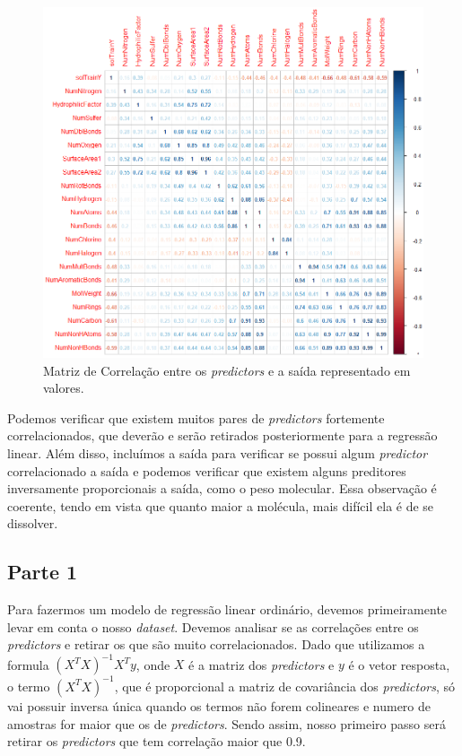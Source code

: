 \documentclass[a4paper,11pt]{article}
\begin{document}
	\begin{figure}[!h]
		\includegraphics[scale=0.7]{fig/corrplotNumber}
		\caption{Matriz de Correlação entre os \textit{predictors} e a saída representado em valores.}
		\label{fig:Figura 2}
	\end{figure}
	Podemos verificar que existem muitos pares de \textit{predictors} fortemente correlacionados, que deverão e serão retirados posteriormente para a regressão linear. Além disso, incluímos a saída para verificar se possui algum \textit{predictor} correlacionado a saída e podemos verificar que existem alguns preditores inversamente proporcionais a saída, como o peso molecular. Essa observação é coerente, tendo em vista que quanto maior a molécula, mais difícil ela é de se dissolver.
	\newpage
	\begin{center}
		\section*{Parte 1}
	\end{center}
	Para fazermos um modelo de regressão linear ordinário, devemos primeiramente levar em conta o nosso \textit{dataset}. Devemos analisar se as correlações entre os \textit{predictors} e retirar os que são muito correlacionados. Dado que utilizamos a formula $(X^{T} X)^{-1}X^{T}y$, onde $X$ é a matriz dos \textit{predictors} e $y$ é o vetor resposta, o termo $(X^{T} X)^{-1}$, que é proporcional a matriz de covariância dos \textit{predictors}, só vai possuir inversa única quando os termos não forem colineares e numero de amostras for maior que os de \textit{predictors}. Sendo assim, nosso primeiro passo será retirar os \textit{predictors} que tem correlação maior que 0.9.
\end{document}
